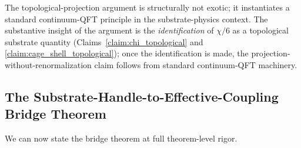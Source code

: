 \documentclass[11pt,letterpaper]{article}
\begin{document}
The topological-projection argument is structurally not exotic; it instantiates a standard continuum-QFT principle in the substrate-physics context. The substantive insight of the argument is the \emph{identification} of $\chi/6$ as a topological substrate quantity (Claims~\ref{claim:chi_topological} and \ref{claim:cage_shell_topological}); once the identification is made, the projection-without-renormalization claim follows from standard continuum-QFT machinery.

\subsection{The Substrate-Handle-to-Effective-Coupling Bridge Theorem}
\label{sec:bridge_theorem}

We can now state the bridge theorem at full theorem-level rigor.
\end{document}
